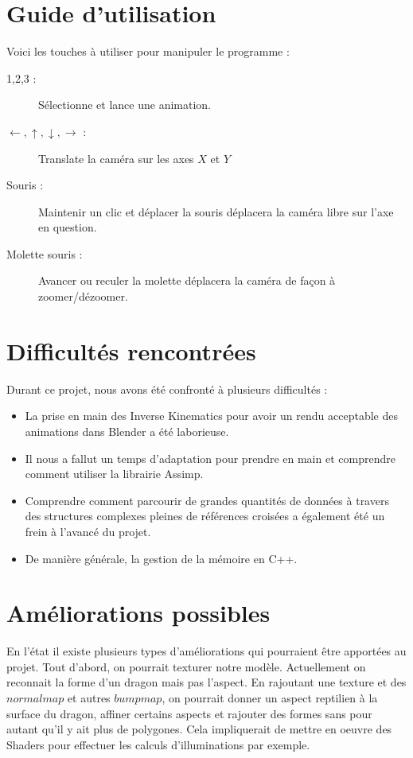 \documentclass[a4paper]{report}
\begin{document}
\section{Guide d'utilisation}
Voici les touches à utiliser pour manipuler le programme :
\begin{description}
	\item[1,2,3 :] Sélectionne et lance une animation.
	\item[$\leftarrow,\uparrow,\downarrow,\rightarrow$ :] Translate la caméra sur les axes $X$ et $Y$
	\item[Souris :] Maintenir un clic et déplacer la souris déplacera la caméra libre sur l'axe en question.
	\item[Molette souris :] Avancer ou reculer la molette déplacera la caméra de façon à zoomer/dézoomer.
\end{description}
\section{Difficultés rencontrées}
\par
Durant ce projet, nous avons été confronté à plusieurs difficultés :
\begin{itemize}
\item La prise en main des Inverse Kinematics pour avoir un rendu acceptable des animations dans Blender a été laborieuse.
\item Il nous a fallut un temps d'adaptation pour prendre en main et comprendre comment utiliser la librairie Assimp.
\item Comprendre comment parcourir de grandes quantités de données à travers des structures complexes pleines de références croisées a également été un frein à l'avancé du projet.
\item De manière générale, la gestion de la mémoire en C++.
\end{itemize}
\section{Améliorations possibles}
\par
En l'état il existe plusieurs types d'améliorations qui pourraient être apportées au projet. Tout d'abord, on pourrait texturer notre modèle. Actuellement on reconnait la forme d'un dragon mais pas l'aspect. En rajoutant une texture et des $normal map$ et autres $bump map$, on pourrait donner un aspect reptilien à la surface du dragon, affiner certains aspects et rajouter des formes sans pour autant qu'il y ait plus de polygones. Cela impliquerait de mettre en oeuvre des Shaders pour effectuer les calculs d'illuminations par exemple. 
\end{document}
